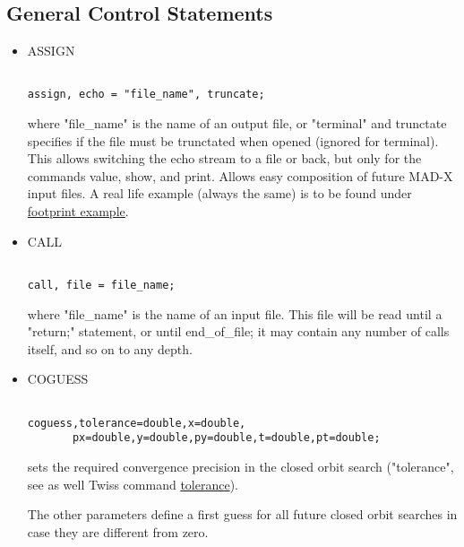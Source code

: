 




\subsection{General Control Statements}


\begin{itemize}
	\item ASSIGN
\begin{verbatim}

assign, echo = "file_name", truncate;
\end{verbatim} where "file\_name"  is the name of an output file, or "terminal" and trunctate specifies if the file must be trunctated when opened (ignored for terminal). This allows switching the echo stream to a file or back, but only for the commands value, show, and print. Allows easy composition of future MAD-X input files. A real life example (always the same) is to be found under \href{foot.html}{footprint example}. 


	\item CALL
\begin{verbatim}

call, file = file_name;
\end{verbatim} where "file\_name"  is the name of an input file. This file will be read until a "return;" statement, or until end\_of\_file; it may contain any number of calls itself, and so on to any depth. 


	\item COGUESS
\begin{verbatim}

coguess,tolerance=double,x=double,
       px=double,y=double,py=double,t=double,pt=double;
\end{verbatim} sets the required convergence precision in the closed orbit search ("tolerance", see as well Twiss command \href{../twiss/twiss.html#tolerance}{tolerance}). 

 The other parameters define a first guess for all future closed orbit searches in case they are different from zero. 



\end{itemize}

